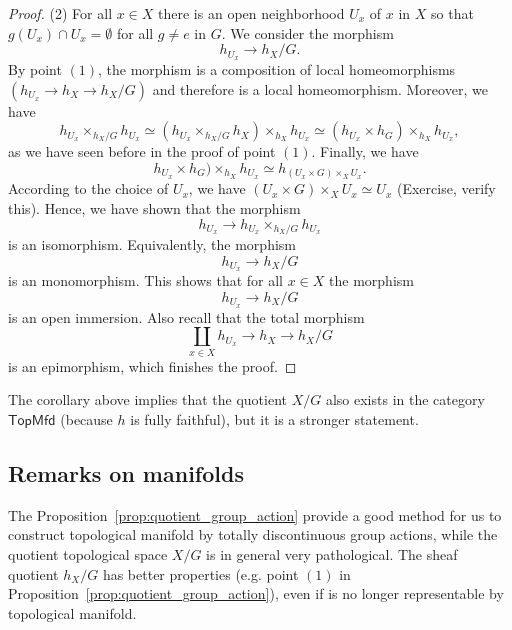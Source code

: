 \documentclass{tufte-book} %
\numberwithin{dummy}{section}
\newcommand{\lrta}{\longrightarrow}
\begin{document}
\begin{proof}
(2) For all $x\in X$ there is an open neighborhood $U_x$ of $x$ in $X$ so that $g(U_x)\cap U_x=\emptyset$ for all $g\neq e$ in $G$. We consider the morphism
$$
h_{U_x}\lrta h_X/G.
$$
By point $(1)$, the morphism is a composition of local homeomorphisms $(h_{U_x}\lrta h_X\lrta h_X/G)$ and therefore is a local homeomorphism. Moreover,  we have
$$
h_{U_x}\times_{h_X/G}h_{U_x}\simeq (h_{U_x}\times_{h_X/G}h_X)\times_{h_X}h_{U_x}\simeq (h_{U_x}\times h_G)\times_{h_X}h_{U_x},
$$
as we have seen before in the proof of point $(1)$. Finally, we have
$$
h_{U_x}\times h_G)\times_{h_X}h_{U_x}\simeq h_{(U_x\times G)\times_X U_x}.
$$
According to the choice of $U_x$, we have $(U_x\times G)\times_X U_x\simeq U_x$ (Exercise, verify this). Hence, we have shown that the morphism
$$
h_{U_x}\lrta h_{U_x}\times_{h_X/G}h_{U_x}
$$
is an isomorphism. Equivalently, the morphism
$$
h_{U_x}\lrta h_X/G
$$
is an monomorphism. This shows that for all $x\in X$ the morphism
$$
h_{U_x}\lrta h_X/G
$$
is an open immersion. Also recall that the total morphism
$$
\coprod_{x\in X}h_{U_x}\lrta h_X\lrta h_X/G
$$
is an epimorphism, which finishes the proof.
\end{proof}
The corollary above implies that the quotient $X/G$ also exists in the category $\mathsf{TopMfd}$ (because $h$ is fully faithful), but it is a stronger statement.
\subsection{Remarks on manifolds}
The Proposition~\ref{prop:quotient_group_action} provide a good method for us to construct topological manifold by totally discontinuous group actions, while the quotient topological space $X/G$ is in general very pathological. The sheaf quotient $h_X/G$ has better properties (e.g. point $(1)$ in Proposition~\ref{prop:quotient_group_action}), even if is no longer representable by topological manifold.
\end{document}
